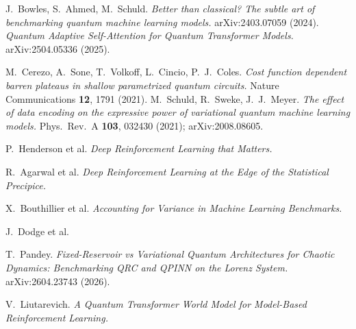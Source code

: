 \documentclass[11pt,onecolumn]{article}
\newif\ifdraft
\newcommand{\pend}[1]{%
  \ifdraft\textcolor{PendFG}{\textbf{[}\textit{#1}\textbf{]}}\fi}
\begin{document}

\begin{thebibliography}{9}
 J.~Bowles, S.~Ahmed, M.~Schuld. \emph{Better than
  classical? The subtle art of benchmarking quantum machine learning
  models.} arXiv:2403.07059 (2024).
 \emph{Quantum Adaptive Self-Attention for Quantum
  Transformer Models.} arXiv:2504.05336 (2025).
  \pend{author list from the revised version}
 M.~Cerezo, A.~Sone, T.~Volkoff, L.~Cincio,
  P.~J.~Coles. \emph{Cost function dependent barren plateaus in shallow
  parametrized quantum circuits.} Nature Communications \textbf{12},
  1791 (2021).
 M.~Schuld, R.~Sweke, J.~J.~Meyer. \emph{The effect
  of data encoding on the expressive power of variational quantum
  machine learning models.} Phys.\ Rev.\ A \textbf{103}, 032430 (2021);
  arXiv:2008.08605. \pend{confirm volume and page}
 P.~Henderson et al. \emph{Deep Reinforcement
  Learning that Matters.} \pend{full citation}
 R.~Agarwal et al. \emph{Deep Reinforcement
  Learning at the Edge of the Statistical Precipice.} \pend{full
  citation}
 X.~Bouthillier et al. \emph{Accounting for
  Variance in Machine Learning Benchmarks.} \pend{full citation}
 J.~Dodge et al. \pend{full citation; on
  computational cost in model comparison}
 T.~Pandey. \emph{Fixed-Reservoir vs Variational
  Quantum Architectures for Chaotic Dynamics: Benchmarking QRC and QPINN
  on the Lorenz System.} arXiv:2604.23743 (2026). \pend{verify}
 V.~Liutarevich. \emph{A Quantum Transformer World Model
  for Model-Based Reinforcement Learning.} \pend{companion paper; cite
  by arXiv identifier once posted}
\end{thebibliography}
\end{document}
